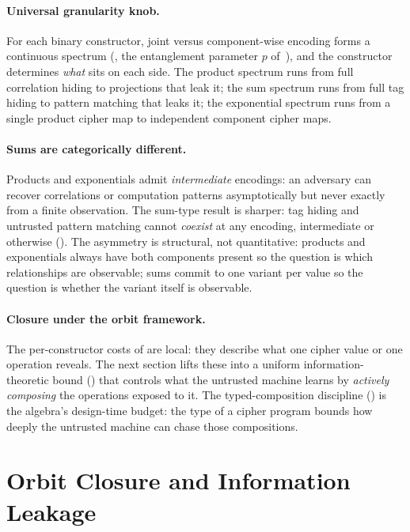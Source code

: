 \documentclass[11pt]{article}
\theoremstyle{definition}
\theoremstyle{plain}
\theoremstyle{remark}
\begin{document}
\paragraph{Universal granularity knob.}
For each binary constructor, joint versus component-wise encoding
forms a continuous spectrum (, the
entanglement parameter $p$ of~\cite[Sec.~8.1]{towell2026cipher}), and
the constructor determines \emph{what} sits on each side.
The product spectrum runs from full correlation hiding to projections
that leak it; the sum spectrum runs from full tag hiding to pattern
matching that leaks it; the exponential spectrum runs from a single
product cipher map to independent component cipher maps.

\paragraph{Sums are categorically different.}
Products and exponentials admit \emph{intermediate} encodings: an
adversary can recover correlations or computation patterns
asymptotically but never exactly from a finite observation.
The sum-type result is sharper: tag hiding and untrusted pattern
matching cannot \emph{coexist} at any encoding, intermediate or
otherwise ().
The asymmetry is structural, not quantitative: products and
exponentials always have both components present so the question is
which relationships are observable; sums commit to one variant per
value so the question is whether the variant itself is observable.

\paragraph{Closure under the orbit framework.}
The per-constructor costs of  are local:
they describe what one cipher value or one operation reveals.
The next section lifts these into a uniform information-theoretic
bound () that controls what the
untrusted machine learns by \emph{actively composing} the operations
exposed to it.
The typed-composition discipline () is the
algebra's design-time budget: the type of a cipher program bounds
how deeply the untrusted machine can chase those compositions.


\section{Orbit Closure and Information Leakage}
\label{sec:orbit}
\end{document}
